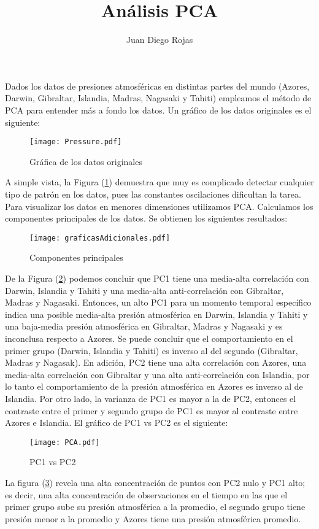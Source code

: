 \documentclass{article}
\title{Análisis PCA}
\author{Juan Diego Rojas}
\begin{document}
	\maketitle
	Dados los datos de presiones atmosféricas en distintas partes del mundo (Azores, Darwin, Gibraltar, Islandia, Madras, Nagasaki y Tahiti) empleamos el método de PCA para entender más a fondo los datos. Un gráfico de los datos originales es el siguiente:
	\begin{figure}[H]
		\centering
		\texttt{[image: Pressure.pdf]}
		\caption{Gráfica de los datos originales}
		\label{fig:pressure}
	\end{figure}
	A simple vista, la Figura (\ref{fig:pressure}) demuestra que muy es complicado detectar cualquier tipo de patrón en los datos, pues las constantes oscilaciones dificultan la tarea. Para visualizar los datos en menores dimensiones utilizamos PCA. Calculamos los componentes principales de los datos. Se obtienen los siguientes resultados:
	\begin{figure}[H]
		\centering
		\texttt{[image: graficasAdicionales.pdf]}
		\caption{Componentes principales}
		\label{fig:additional}
	\end{figure}
	De la Figura (\ref{fig:additional}) podemos concluir que PC1 tiene una media-alta correlación con Darwin, Islandia y Tahiti y una media-alta anti-correlación con Gibraltar, Madras y Nagasaki.  Entonces, un alto PC1 para un momento temporal específico indica una posible media-alta presión atmosférica en Darwin, Islandia y Tahiti y una baja-media presión atmosférica en Gibraltar, Madras y Nagasaki y es inconclusa respecto a Azores. Se puede concluir que el comportamiento en el primer grupo (Darwin, Islandia y Tahiti) es inverso al del segundo (Gibraltar, Madras y Nagasak). En  adición, PC2 tiene una alta correlación con Azores, una media-alta correlación con Gibraltar y una alta anti-correlación con Islandia, por lo tanto el comportamiento de la presión atmosférica en Azores es inverso al de Islandia. Por otro lado, la varianza de PC1 es mayor a la de PC2, entonces el contraste entre el primer y segundo grupo de PC1 es mayor al contraste entre Azores e Islandia. El gráfico de PC1 vs PC2 es el siguiente:
	\begin{figure}[H]
		\centering
		\texttt{[image: PCA.pdf]}
		\caption{PC1 vs PC2}
		\label{fig:PCA}
	\end{figure}
	La figura (\ref{fig:PCA}) revela una alta concentración de puntos con PC2 nulo y PC1 alto; es decir, una alta concentración de observaciones en el tiempo en las que el primer grupo sube su presión atmosférica a la promedio, el segundo grupo tiene presión menor a la promedio y Azores tiene una presión atmosférica promedio.
\end{document}
